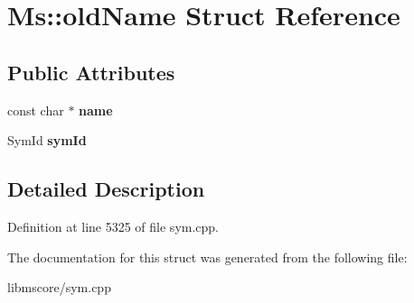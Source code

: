 \hypertarget{struct_ms_1_1old_name}{}\section{Ms\+:\+:old\+Name Struct Reference}
\label{struct_ms_1_1old_name}
\subsection*{Public Attributes}
\begin{DoxyCompactItemize}
\item 
\mbox{\label{struct_ms_1_1old_name_a27c46286c640cc80d10693eca310b850}} 
const char $\ast$ {\bfseries name}
\item 
\mbox{\label{struct_ms_1_1old_name_a8326848b207e191608f75dac98b2790f}} 
Sym\+Id {\bfseries sym\+Id}
\end{DoxyCompactItemize}


\subsection{Detailed Description}


Definition at line 5325 of file sym.\+cpp.



The documentation for this struct was generated from the following file\+:\begin{DoxyCompactItemize}
\item 
libmscore/sym.\+cpp\end{DoxyCompactItemize}

